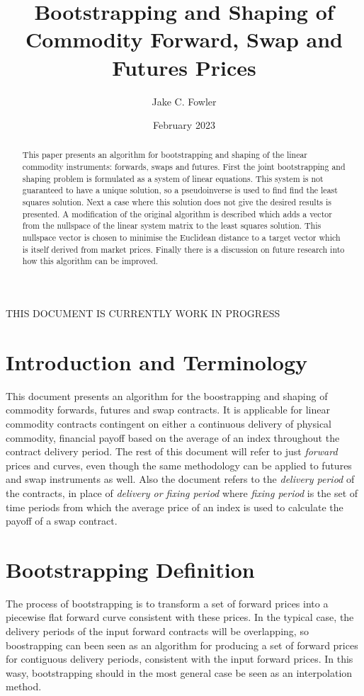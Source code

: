 \documentclass{article}
\title{Bootstrapping and Shaping of Commodity Forward, Swap and Futures Prices}
\author{Jake C. Fowler}
\date{February 2023}
\begin{document}
\newcommand{\+}[1]{\ensuremath{\mathbf{#1}}}

\maketitle

THIS DOCUMENT IS CURRENTLY WORK IN PROGRESS


\begin{abstract}
    This paper presents an algorithm for bootstrapping and shaping of the linear commodity
    instruments: forwards, swaps and futures. First the joint bootstrapping and shaping
    problem is formulated as a system of linear equations. This system is not guaranteed to have
    a unique solution, so a pseudoinverse is used to find
    find the least squares solution. Next a case where this solution does not give
    the desired results is presented. A modification of the original algorithm is
    described which adds a vector from the nullspace of the linear system matrix to
    the least squares solution. This nullspace vector is chosen to minimise the 
    Euclidean distance to a target vector which is itself derived from market prices.
    Finally there is a discussion on future research into how this algorithm can be 
    improved.
\end{abstract}


\section{Introduction and Terminology}
This document presents an algorithm for the boostrapping and shaping of commodity forwards, futures and swap 
contracts. It is applicable for linear commodity contracts contingent on either a continuous delivery
of physical commodity, financial payoff based on the average of an index throughout the
contract delivery period. The rest of this document will refer to just \emph{forward} prices and curves, even though the same 
methodology can be applied to futures and swap instruments as well. Also the document refers 
to the \emph{delivery period} of the contracts, in place of 
\emph{delivery or fixing period} where \emph{fixing period} is the set of time periods from 
which the average price of an index is used to calculate the payoff of a swap contract.

\section{Bootstrapping Definition}
The process of bootstrapping is to transform a set of forward prices into a piecewise 
flat forward curve consistent with these prices. In the typical case, the delivery periods 
of the input forward contracts will be overlapping, so boostrapping can been seen as an
algorithm for producing a set of forward prices for contiguous delivery periods, consistent
with the input forward prices.
In this wasy, bootstrapping should in the most general case be seen as an interpolation method.
\end{document}
